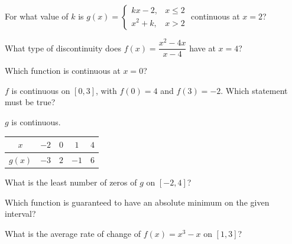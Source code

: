 \begin{exo}{}
For what value of $k$ is $g(x)=\begin{cases}kx-2, & x\le2\\ x^2+k, & x>2\end{cases}$ continuous at $x=2$?
\end{exo}
\begin{exo}{}
What type of discontinuity does $f(x)=\dfrac{x^2-4x}{x-4}$ have at $x=4$?
\end{exo}
\begin{exo}{}
Which function is continuous at $x=0$?
\end{exo}
\begin{exo}{}
$f$ is continuous on $[0,3]$, with $f(0)=4$ and $f(3)=-2$. Which statement must be true?
\end{exo}
\begin{exo}{}
$g$ is continuous. \;\begin{tabular}{|c|c|c|c|c|}\hline$x$&$-2$&$0$&$1$&$4$\\\hline$g(x)$&$-3$&$2$&$-1$&$6$\\\hline\end{tabular}\; What is the least number of zeros of $g$ on $[-2,4]$?
\end{exo}
\begin{exo}{}
Which function is guaranteed to have an absolute minimum on the given interval?
\choices{$\frac1x$ on $[1,4]$}{$\frac1x$ on $(0,4]$}{$x$ on $(0,1)$}{$\frac1{x-2}$ on $[1,3]$}
\end{exo}
\begin{exo}{}
What is the average rate of change of $f(x)=x^3-x$ on $[1,3]$?
\end{exo}
